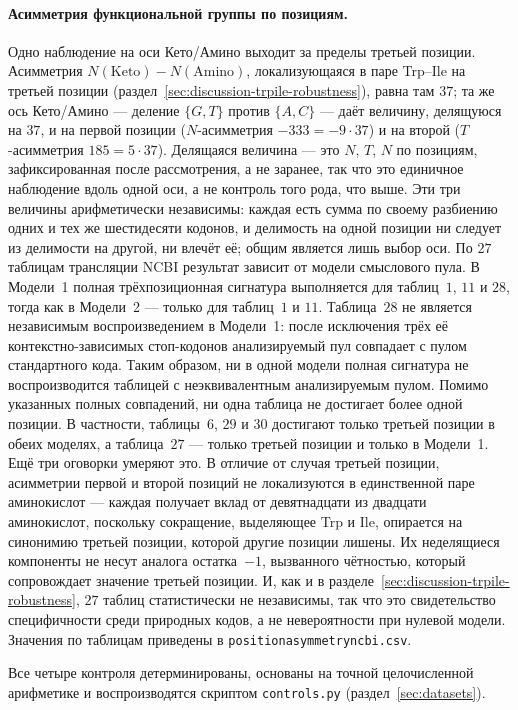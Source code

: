 \documentclass[11pt,a4paper]{article}
\renewcommand{\_}{\origunderscore\allowbreak}
\begin{document}
\paragraph{Асимметрия функциональной группы по позициям.}
Одно наблюдение на оси Кето/Амино выходит за пределы третьей
позиции. Асимметрия $N(\mathrm{Keto}) - N(\mathrm{Amino})$,
локализующаяся в паре Trp--Ile на третьей позиции
(раздел~\ref{sec:discussion-trpile-robustness}), равна там $37$;
та же ось Кето/Амино — деление $\{G,T\}$ против $\{A,C\}$ — даёт
величину, делящуюся на $37$, и на первой позиции
($N$-асимметрия $-333 = -9 \cdot 37$) и на второй
($T$-асимметрия $185 = 5 \cdot 37$). Делящаяся величина — это
$N$, $T$, $N$ по позициям, зафиксированная после рассмотрения, а
не заранее, так что это единичное наблюдение вдоль одной оси, а
не контроль того рода, что выше. Эти три величины
арифметически независимы: каждая есть сумма по своему разбиению
одних и тех же шестидесяти кодонов, и делимость на одной позиции
ни следует из делимости на другой, ни влечёт её; общим является
лишь выбор оси. По $27$ таблицам трансляции NCBI результат
зависит от модели смыслового пула. В Модели~1 полная
трёхпозиционная сигнатура выполняется для таблиц~$1$, $11$ и
$28$, тогда как в Модели~2 --- только для таблиц~$1$ и $11$.
Таблица~$28$ не является независимым воспроизведением в
Модели~1: после исключения трёх её контекстно-зависимых
стоп-кодонов анализируемый пул совпадает с пулом стандартного
кода. Таким образом, ни в одной модели полная сигнатура не
воспроизводится таблицей с неэквивалентным анализируемым пулом.
Помимо указанных полных совпадений, ни одна таблица не достигает
более одной позиции. В частности, таблицы~$6$, $29$ и $30$
достигают только третьей позиции в обеих моделях, а таблица~$27$
--- только третьей позиции и только в Модели~1. Ещё три оговорки
умеряют это. В отличие от случая третьей позиции, асимметрии первой и
второй позиций не локализуются в единственной паре аминокислот
--- каждая получает вклад от девятнадцати из двадцати
аминокислот, поскольку сокращение, выделяющее Trp и Ile,
опирается на синонимию третьей позиции, которой другие позиции
лишены. Их неделящиеся компоненты не несут аналога остатка~$-1$,
вызванного чётностью, который сопровождает значение третьей
позиции. И, как и в разделе~\ref{sec:discussion-trpile-robustness},
$27$ таблиц статистически не независимы, так что это
свидетельство специфичности среди природных кодов, а не
невероятности при нулевой модели. Значения по таблицам приведены
в \texttt{position\_asymmetry\_ncbi.csv}.

Все четыре контроля детерминированы, основаны на точной
целочисленной арифметике и воспроизводятся скриптом
\texttt{controls.py}
(раздел~\ref{sec:datasets}).
\end{document}
